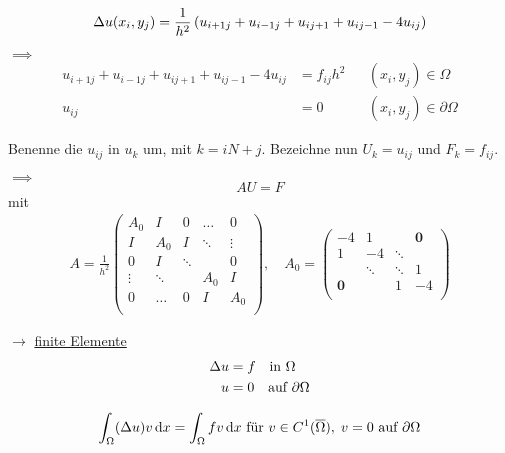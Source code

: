 \begin{equation*}
	\Delta u(x_i,y_j) = \frac{1}{h^2} \left( u_{i+1 j} + u_{i-1 j} + u_{i j+1} + u_{i j-1} - 4u_{i j} \right)
\end{equation*}

$\implies$
\begin{align*}
	 u_{i+1 j} + u_{i-1 j} + u_{i j+1} + u_{i j-1} - 4u_{i j} &= f_{i j}h^2 & & (x_i,y_j) \in \Omega\\
	 u_{i j} &= 0 & & (x_i,y_j) \in \partial\Omega 
\end{align*}

Benenne die $u_{ij}$ in $u_k$ um, mit $k = iN+j$. Bezeichne nun $U_k = u_{ij}$ und $F_k = f_{ij} $.

$\implies$
\begin{equation*}
	AU = F 
\end{equation*}
mit 
\begin{align*}
	A = \frac{1}{h^2}
	\begin{pmatrix}
	A_0       & I        & 0		&\dots  & 0     \\
	I		  & A_0 	 & I 		&\ddots & \vdots\\
	0		  & I        & \ddots 	&		& 0     \\
	\vdots    & \ddots   & 		  	& A_0	&	I   \\
	0		  & \dots 	 & 0  		& I 	& A_0   \\
	\end{pmatrix}, 
	\quad
	A_0 = 
	\begin{pmatrix}
	-4    		& 1      & 		  & \textbf{0}  \\
	1	  		& -4 	 & \ddots & 			\\
		  		& \ddots & \ddots &	1   \\
	\textbf{0}	& 	     & 1 	  & -4   \\
	\end{pmatrix}
\end{align*}


$\rightarrow$ \underline{finite Elemente}\enter
\enter
\begin{align*}
  \Delta u &= f \quad  \text{in}\  \Omega\\
  u &= 0 \quad \text{auf}\ \partial\Omega
\end{align*}

\begin{equation*}
	\int_\Omega (\Delta u) v \mathop{}\!\mathrm{d} x = \int_\Omega fv \mathop{}\!\mathrm{d} x \text { f\"ur } v\in C^1(\overline{\Omega}), \; v=0 \text{ auf } \partial \Omega
\end{equation*}


